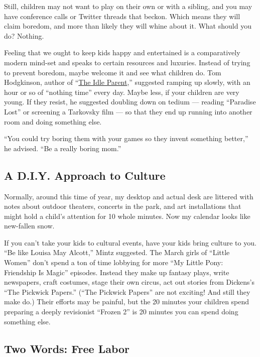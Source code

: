 Still, children may not want to play on their own or with a sibling, and
you may have conference calls or Twitter threads that beckon. Which
means they will claim boredom, and more than likely they will whine
about it. What should you do? Nothing.

Feeling that we ought to keep kids happy and entertained is a
comparatively modern mind-set and speaks to certain resources and
luxuries. Instead of trying to prevent boredom, maybe welcome it and see
what children do. Tom Hodgkinson, author of
``\href{https://www.penguin.co.uk/books/56063/the-idle-parent/9780141030357.html}{The
Idle Parent},'' suggested ramping up slowly, with an hour or so of
``nothing time'' every day. Maybe less, if your children are very young.
If they resist, he suggested doubling down on tedium --- reading
``Paradise Lost'' or screening a Tarkovsky film --- so that they end up
running into another room and doing something else.

``You could try boring them with your games so they invent something
better,'' he advised. ``Be a really boring mom.''

\hypertarget{a-diy-approach-to-culture}{%
\subsection{A D.I.Y. Approach to
Culture}\label{a-diy-approach-to-culture}}

Normally, around this time of year, my desktop and actual desk are
littered with notes about outdoor theaters, concerts in the park, and
art installations that might hold a child's attention for 10 whole
minutes. Now my calendar looks like new-fallen snow.

If you can't take your kids to cultural events, have your kids bring
culture to you. ``Be like Louisa May Alcott,'' Mintz suggested. The
March girls of ``Little Women'' don't spend a ton of time lobbying for
more ``My Little Pony: Friendship Is Magic'' episodes. Instead they make
up fantasy plays, write newspapers, craft costumes, stage their own
circus, act out stories from Dickens's ``The Pickwick Papers.'' (``The
Pickwick Papers'' are not exciting! And still they make do.) Their
efforts may be painful, but the 20 minutes your children spend preparing
a deeply revisionist ``Frozen 2'' is 20 minutes you can spend doing
something else.

\hypertarget{two-words-free-labor}{%
\subsection{Two Words: Free Labor}\label{two-words-free-labor}}

